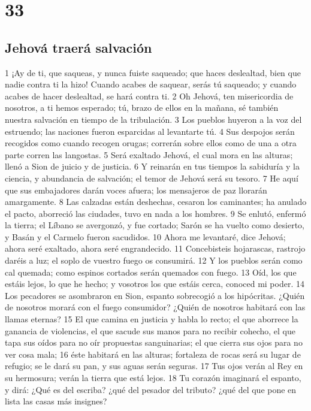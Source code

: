 \chapter{33}

\section*{Jehová traerá salvación}

1 ¡Ay de ti, que saqueas, y nunca fuiste saqueado; que haces deslealtad, bien que nadie contra ti la hizo! Cuando acabes de saquear, serás tú saqueado; y cuando acabes de hacer deslealtad, se hará contra ti.
2 Oh Jehová, ten misericordia de nosotros, a ti hemos esperado; tú, brazo de ellos en la mañana, sé también nuestra salvación en tiempo de la tribulación.
3 Los pueblos huyeron a la voz del estruendo; las naciones fueron esparcidas al levantarte tú.
4 Sus despojos serán recogidos como cuando recogen orugas; correrán sobre ellos como de una a otra parte corren las langostas.
5 Será exaltado Jehová, el cual mora en las alturas; llenó a Sion de juicio y de justicia.
6 Y reinarán en tus tiempos la sabiduría y la ciencia, y abundancia de salvación; el temor de Jehová será su tesoro.
7 He aquí que sus embajadores darán voces afuera; los mensajeros de paz llorarán amargamente.
8 Las calzadas están deshechas, cesaron los caminantes; ha anulado el pacto, aborreció las ciudades, tuvo en nada a los hombres.
9 Se enlutó, enfermó la tierra; el Líbano se avergonzó, y fue cortado; Sarón se ha vuelto como desierto, y Basán y el Carmelo fueron sacudidos.
10 Ahora me levantaré, dice Jehová; ahora seré exaltado, ahora seré engrandecido.
11 Concebisteis hojarascas, rastrojo daréis a luz; el soplo de vuestro fuego os consumirá.
12 Y los pueblos serán como cal quemada; como espinos cortados serán quemados con fuego.
13 Oíd, los que estáis lejos, lo que he hecho; y vosotros los que estáis cerca, conoced mi poder.
14 Los pecadores se asombraron en Sion, espanto sobrecogió a los hipócritas. ¿Quién de nosotros morará con el fuego consumidor? ¿Quién de nosotros habitará con las llamas eternas?
15 El que camina en justicia y habla lo recto; el que aborrece la ganancia de violencias, el que sacude sus manos para no recibir cohecho, el que tapa sus oídos para no oír propuestas sanguinarias; el que cierra sus ojos para no ver cosa mala;
16 éste habitará en las alturas; fortaleza de rocas será su lugar de refugio; se le dará su pan, y sus aguas serán seguras.
17 Tus ojos verán al Rey en su hermosura; verán la tierra que está lejos.
18 Tu corazón imaginará el espanto, y dirá: ¿Qué es del escriba? ¿qué del pesador del tributo? ¿qué del que pone en lista las casas más insignes?
